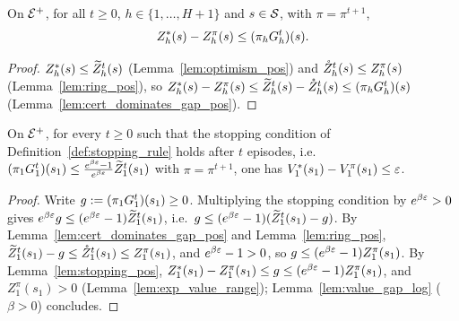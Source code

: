 \begin{lemma}\label{lem:stopping_pos}
\leanok
{}
On $\mathcal{E}^+$, for all $t \ge 0$, $h \in \{1, \dots, H + 1\}$ and $s \in \mathcal{S}$, with $\pi = \pi^{t+1}$,
\[
  Z^*_h(s) - Z^\pi_h(s) \le (\pi_hG_h^t)(s) .
\]
\end{lemma}

\begin{proof}
\leanok
$Z^*_h(s) \le \widetilde{Z}_h^t(s)$ (Lemma~\ref{lem:optimism_pos}) and $\mathring{Z}_h^t(s) \le Z^\pi_h(s)$
(Lemma~\ref{lem:ring_pos}), so $Z^*_h(s) - Z^\pi_h(s) \le \widetilde{Z}_h^t(s) - \mathring{Z}_h^t(s) \le (\pi_hG_h^t)(s)$
(Lemma~\ref{lem:cert_dominates_gap_pos}).
\end{proof}

\begin{lemma}\label{lem:pac_at_stopping_pos}
\leanok
{}
On $\mathcal{E}^+$, for every $t \ge 0$ such that the stopping condition of
Definition~\ref{def:stopping_rule} holds after $t$ episodes, i.e.\
$(\pi_1G_1^t)(s_1) \le \frac{e^{\beta\varepsilon} - 1}{e^{\beta\varepsilon}}\widetilde{Z}_1^t(s_1)$ with $\pi = \pi^{t+1}$,
one has $V^*_1(s_1) - V^\pi_1(s_1) \le \varepsilon$.
\end{lemma}

\begin{proof}
\leanok
Write $g := (\pi_1G_1^t)(s_1) \ge 0$. Multiplying the stopping condition by $e^{\beta\varepsilon} > 0$
gives $e^{\beta\varepsilon} g \le (e^{\beta\varepsilon} - 1)\widetilde{Z}_1^t(s_1)$, i.e.\ $g \le (e^{\beta\varepsilon} - 1)(\widetilde{Z}_1^t(s_1) - g)$.
By Lemma~\ref{lem:cert_dominates_gap_pos} and Lemma~\ref{lem:ring_pos},
$\widetilde{Z}_1^t(s_1) - g \le \mathring{Z}_1^t(s_1) \le Z^\pi_1(s_1)$, and $e^{\beta\varepsilon} - 1 > 0$, so
$g \le (e^{\beta\varepsilon} - 1) Z^\pi_1(s_1)$. By Lemma~\ref{lem:stopping_pos},
$Z^*_1(s_1) - Z^\pi_1(s_1) \le g \le (e^{\beta\varepsilon} - 1)Z^\pi_1(s_1)$, and $Z^\pi_1(s_1) > 0$
(Lemma~\ref{lem:exp_value_range}); Lemma~\ref{lem:value_gap_log} ($\beta > 0$) concludes.
\end{proof}

